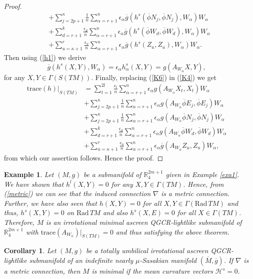 \documentclass[reqno, 12pt]{amsart}
\numberwithin{equation}{section}
\newtheorem{corollary}[theorem]{Corollary}
\newtheorem{example}[theorem]{Example}
\begin{document}
\begin{proof}
\begin{align}
  &+\sum_{j=2p+1}^{\kappa}\frac{1}{n}\sum_{\alpha=r+1}^{n}\epsilon_{\alpha}\overline{g}(h^{s}(\overline{\phi}N_{j},\overline{\phi}N_{j}),W_{\alpha})W_{\alpha}\nonumber\\
  &+\sum_{d=r+1}^{k}\frac{\epsilon_{d}}{n}\sum_{\alpha=r+1}^{n}\epsilon_{\alpha}\overline{g}(h^{s}(\overline{\phi}W_{d},\overline{\phi}W_{d}),W_{\alpha})W_{\alpha}\nonumber\\
  &+\sum_{u=\kappa+1}^{r}\frac{\epsilon_{u}}{n}\sum_{\alpha=r+1}^{n}\epsilon_{\alpha}\overline{g}(h^{s}(Z_{u},Z_{u}),W_{\alpha})W_{\alpha}.
 \end{align}
 Then using (\ref{h1}) we derive
 \begin{equation}\label{K6}
  \overline{g}(h^{s}(X,Y),W_{\alpha})=\epsilon_{\alpha}h_{\alpha}^{s}(X,Y)=g(A_{W_{\alpha}}X,Y),
 \end{equation}
for any $X,Y\in\Gamma(S(TM))$. Finally, replacing (\ref{K6}) in (\ref{K4}) we get 
 \begin{align}\label{K7}
  \mathrm{trace}(h)|_{S(TM)}&=\sum_{t=1}^{2l}\frac{\epsilon_{t}}{n}\sum_{\alpha=r+1}^{n}\epsilon_{\alpha}g(A_{W_{\alpha}}X_{t},X_{t})W_{\alpha}\nonumber\\
  &+\sum_{j=2p+1}^{\kappa}\frac{1}{n}\sum_{\alpha=r+1}^{n}\epsilon_{\alpha}g(A_{W_{\alpha}}\overline{\phi}E_{j},\overline{\phi}E_{j})W_{\alpha}\nonumber\\
  &+\sum_{j=2p+1}^{\kappa}\frac{1}{n}\sum_{\alpha=r+1}^{n}\epsilon_{\alpha}g(A_{W_{\alpha}}\overline{\phi}N_{j},\overline{\phi}N_{j})W_{\alpha}\nonumber\\
  &+\sum_{d=r+1}^{k}\frac{\epsilon_{d}}{n}\sum_{\alpha=r+1}^{n}\epsilon_{\alpha}g(A_{W_{\alpha}}\overline{\phi}W_{d},\overline{\phi} W_{d})W_{\alpha}\nonumber\\
 &+\sum_{u=\kappa+1}^{r}\frac{\epsilon_{u}}{n}\sum_{\alpha=r+1}^{n}\epsilon_{\alpha}\overline{g}(A_{W_{\alpha}}Z_{u},Z_{u})W_{\alpha},
 \end{align}
 from which our assertion follows. Hence the proof.
\end{proof}
 
\begin{example}
{\rm
 Let $(M,g)$ be a submanifold of $\mathbb{R}_{4}^{2m+1}$ given in Example \ref{exa1}. We have shown that $h^{l}(X,Y)=0$ for any $X,Y\in\Gamma(TM)$. Hence, from (\ref{metric}) we can see that the induced connection $\nabla$ is a metric connection. Further, we have also seen that $h(X,Y)=0$ for all $X,Y\in\Gamma(\mathrm{Rad} \,TM)$ and thus, $h^{s}(X,Y)=0$ on $\mathrm{Rad} \,TM$ and also $h^{s}(X,E)=0$ for all $X\in\Gamma(TM)$. Therefore, $M$ is an irrotational minimal ascreen QGCR-lightlike submanifold of $\mathbb{R}_{4}^{2m+1}$ with $\mathrm{trace}(A_{W_{\alpha}})|_{S(TM)}=0$ and thus  satisfying the above theorem.
 }
\end{example}
\begin{corollary}
  Let $(M,g)$ be a totally umbilical irrotational ascreen QGCR-lightlike submanifold of an indefinite nearly $\mu$-Sasakian manifold $(\overline{M},\overline{g})$. If $\nabla$  is a metric connection, then $M$ is minimal if the mean curvature vectors  $\mathcal{H}^{s}=0$.
\end{corollary}
\end{document}
